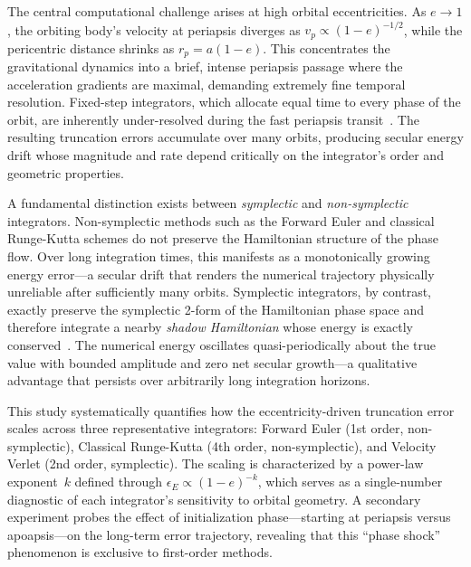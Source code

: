 \documentclass[twocolumn, 10pt]{article}
\begin{document}
The central computational challenge arises at high orbital eccentricities. As $e \to 1$, the orbiting body's velocity at periapsis diverges as $v_p \propto (1-e)^{-1/2}$, while the pericentric distance shrinks as $r_p = a(1-e)$. This concentrates the gravitational dynamics into a brief, intense periapsis passage where the acceleration gradients are maximal, demanding extremely fine temporal resolution. Fixed-step integrators, which allocate equal time to every phase of the orbit, are inherently under-resolved during the fast periapsis transit~\cite{wang2020}. The resulting truncation errors accumulate over many orbits, producing secular energy drift whose magnitude and rate depend critically on the integrator's order and geometric properties.

A fundamental distinction exists between \textit{symplectic} and \textit{non-symplectic} integrators. Non-symplectic methods such as the Forward Euler and classical Runge-Kutta schemes do not preserve the Hamiltonian structure of the phase flow. Over long integration times, this manifests as a monotonically growing energy error---a secular drift that renders the numerical trajectory physically unreliable after sufficiently many orbits. Symplectic integrators, by contrast, exactly preserve the symplectic 2-form of the Hamiltonian phase space and therefore integrate a nearby \textit{shadow Hamiltonian} whose energy is exactly conserved~\cite{kinoshita1991, rein2019}. The numerical energy oscillates quasi-periodically about the true value with bounded amplitude and zero net secular growth---a qualitative advantage that persists over arbitrarily long integration horizons.

This study systematically quantifies how the eccentricity-driven truncation error scales across three representative integrators: Forward Euler (1st order, non-symplectic), Classical Runge-Kutta (4th order, non-symplectic), and Velocity Verlet (2nd order, symplectic). The scaling is characterized by a power-law exponent~$k$ defined through $\epsilon_E \propto (1-e)^{-k}$, which serves as a single-number diagnostic of each integrator's sensitivity to orbital geometry. A secondary experiment probes the effect of initialization phase---starting at periapsis versus apoapsis---on the long-term error trajectory, revealing that this ``phase shock'' phenomenon is exclusive to first-order methods.

\end{document}
